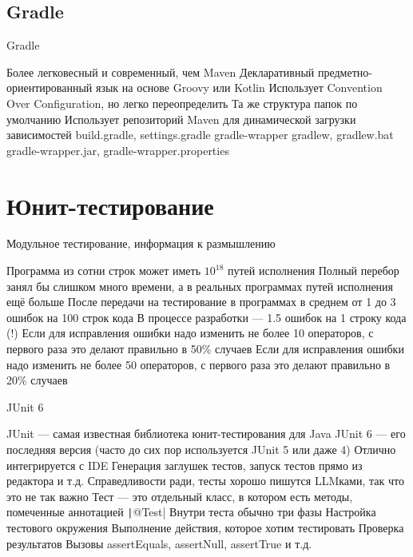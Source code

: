 \documentclass{../../slides-style}
\begin{document}
    \subsection{Gradle}

    \begin{frame}{Gradle}
        \begin{outline}
            \1 Более легковесный и современный, чем Maven
            \1 Декларативный предметно-ориентированный язык на основе Groovy или Kotlin
            \1 Использует Convention Over Configuration, но легко переопределить
                \2 Та же структура папок по умолчанию
            \1 Использует репозиторий Maven для динамической загрузки зависимостей
            \1 build.gradle, settings.gradle
            \1 gradle-wrapper
                \2 gradlew, gradlew.bat
                \2 gradle-wrapper.jar, gradle-wrapper.properties
        \end{outline}
    \end{frame}

    \section{Юнит-тестирование}

    \begin{frame}{Модульное тестирование, информация к размышлению}
        \begin{outline}
            \1 Программа из сотни строк может иметь $10^{18}$ путей исполнения
                \2 Полный перебор занял бы слишком много времени, а в реальных программах путей исполнения ещё больше
            \1 После передачи на тестирование в программах в среднем от 1 до 3 ошибок на 100 строк кода
            \1 В процессе разработки --- 1.5 ошибок на 1 строку кода (!)
            \1 Если для исправления ошибки надо изменить не более 10 операторов, с первого раза это делают правильно в 50\% случаев
            \1 Если для исправления ошибки надо изменить не более 50 операторов, с первого раза это делают правильно в 20\% случаев
        \end{outline}
    \end{frame}

    \begin{frame}{JUnit 6}
        \begin{outline}
            \1 JUnit --- самая известная библиотека юнит-тестирования для Java
            \1 JUnit 6 --- его последняя версия (часто до сих пор используется JUnit 5 или даже 4)
            \1 Отлично интегрируется с IDE
                \2 Генерация заглушек тестов, запуск тестов прямо из редактора и т.д.
                \2 Справедливости ради, тесты хорошо пишутся LLMками, так что это не так важно
            \1 Тест --- это отдельный класс, в котором есть методы, помеченные аннотацией \texttt|@Test|
            \1 Внутри теста обычно три фазы
                \2 Настройка тестового окружения
                \2 Выполнение действия, которое хотим тестировать
                \2 Проверка результатов
                    \3 Вызовы assertEquals, assertNull, assertTrue и т.д.
        \end{outline}
    \end{frame}
\end{document}

